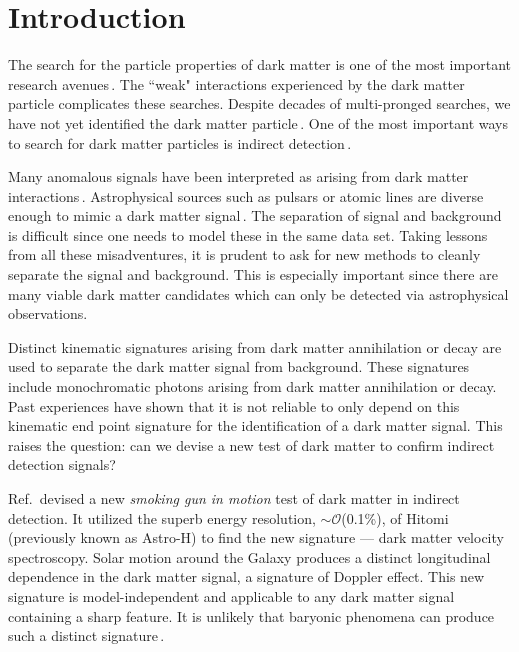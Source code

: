 \documentclass[aps,prd,10pt,twocolumn,superscriptaddress,showpacs,footinbib]{revtex4-1}
\begin{document}
\maketitle


\section{Introduction}
\label{sec:Introduction}

The search for the particle properties of dark matter is one of the most important research avenues\,\cite{Jungman:1995df,Bertone:2004pz,Strigari:2013iaa}.  The ``weak" interactions experienced by the dark matter particle complicates these searches.  Despite decades of multi-pronged searches, we have not yet identified the dark matter particle\,\cite{Bertone:2016nfn}.  One of the most important ways to search for dark matter particles is indirect detection\,\cite{Klasen:2015uma}.

Many anomalous signals have been interpreted as arising from dark matter interactions\,\cite{Elsaesser:2004ap,Loewenstein:2009cm,Prokhorov:2010us,Weniger:2012tx,Huang:2013pda,Gordon:2013vta,Daylan:2014rsa,Abazajian:2014hsa,Lee:2015fea,Bartels:2015aea,Bulbul:2014sua,Boyarsky:2014jta,Urban:2014yda}.  Astrophysical sources such as pulsars or atomic lines are diverse enough to mimic a dark matter signal\,\cite{O'Leary:2015gfa,Brandt:2015ula,O'Leary:2016osi,Gu:2015gqm,Phillips:2015wla,Shah:2016efh}.  The separation of signal and background is difficult since one needs to model these in the same data set.  Taking lessons from all these misadventures, it is prudent to ask for new methods to cleanly separate the signal and background.  This is especially important since there are many viable dark matter candidates which can only be detected via astrophysical observations.  

Distinct kinematic signatures arising from dark matter annihilation or decay are used to separate the dark matter signal from background.  These signatures include monochromatic photons arising from dark matter annihilation or decay.  Past experiences have shown that it is not reliable to only depend on this kinematic end point signature for the identification of a dark matter signal.  This raises the question: can we devise a new test of dark matter to confirm indirect detection signals?

Ref.\,\cite{speckhard2016} devised a new {\it smoking gun in motion} test of dark matter in indirect detection.  It utilized the superb energy resolution, $\sim \mathcal{O}$(0.1\%), of Hitomi (previously known as Astro-H) to find the new signature --- dark matter velocity spectroscopy.  Solar motion around the Galaxy produces a distinct longitudinal dependence in the dark matter signal, a signature of Doppler effect.  This new signature is model-independent and applicable to any dark matter signal containing a sharp feature.  It is unlikely that baryonic phenomena can produce such a distinct signature\,\cite{speckhard2016}.
\end{document}
